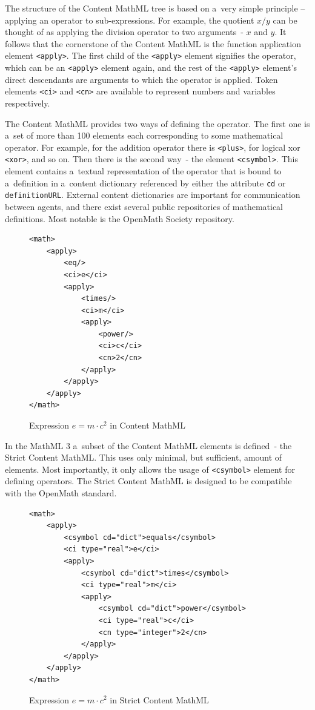 \documentclass[11pt,oneside,final]{fithesis2}
\begin{document}
The structure of the Content MathML tree is based on a~very simple principle – applying an operator to sub-expressions. For example, the quotient $x/y$ can be thought of as applying the division operator to two arguments~- $x$ and $y$. It follows that the cornerstone of the Content MathML is the function application element \texttt{<apply>}.  The first child of the \texttt{<apply>} element signifies the operator, which can be an \texttt{<apply>} element again, and the rest of the \texttt{<apply>} element's direct descendants are arguments to which the operator is applied. Token elements \texttt{<ci>} and \texttt{<cn>} are available to represent numbers and variables respectively. 

The Content MathML provides two ways of defining the operator. The first one is a~set of more than 100 elements each corresponding to some mathematical operator. For example, for the addition operator there is \texttt{<plus>}, for logical xor \texttt{<xor>}, and so on. Then there is the second way~- the element \texttt{<csymbol>}. This element contains a~textual representation of the operator that is bound to a~definition in a~content dictionary referenced by either the attribute \texttt{cd} or \texttt{definitionURL}. External content dictionaries are important for communication between agents, and there exist several public repositories of mathematical definitions. Most notable is the OpenMath Society repository.

\begin{figure}[!ht]
\lstset{language=XML,frame=lines}
\begin{lstlisting}
<math>
	<apply>
		<eq/>
		<ci>e</ci>
		<apply>
			<times/>
			<ci>m</ci>
			<apply>
				<power/>
				<ci>c</ci>
				<cn>2</cn>
			</apply>
		</apply>
	</apply>
</math>
\end{lstlisting}
\caption{Expression $e=m \cdot c^2$ in Content MathML}
\end{figure}

In the MathML 3 a~subset of the Content MathML elements is defined~- the Strict Content MathML. This uses only minimal, but sufficient, amount of elements. Most importantly, it only allows the usage of \texttt{<csymbol>} element for defining operators. The Strict Content MathML is designed to be compatible with the OpenMath standard.

\begin{figure}[!ht]
\lstset{language=XML,frame=lines}
\begin{lstlisting}
<math>
	<apply>
		<csymbol cd="dict">equals</csymbol>
		<ci type="real">e</ci>
		<apply>
			<csymbol cd="dict">times</csymbol>
			<ci type="real">m</ci>
			<apply>
				<csymbol cd="dict">power</csymbol>
				<ci type="real">c</ci>
				<cn type="integer">2</cn>
			</apply>
		</apply>
	</apply>
</math>
\end{lstlisting}
\caption{Expression $e=m \cdot c^2$ in Strict Content MathML}
\end{figure}
\end{document}

